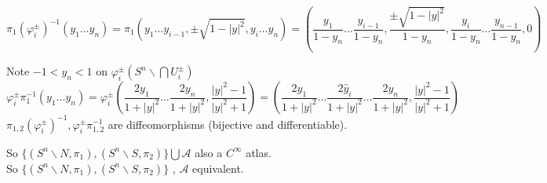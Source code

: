 \begin{enumerate}
\[
\pi_1(\varphi_i^{\pm})^{-1}(y_1 \dots y_n) = \pi_1(y_1 \dots y_{i-1}, \pm \sqrt{ 1 - |y|^2 }, y_i \dots y_n) = \left( \frac{y_1 }{ 1 - y_n} \dots \frac{y_{i-1} }{ 1 - y_n}, \frac{ \pm \sqrt{ 1 - |y|^2 } }{ 1 - y_n } , \frac{y_i}{ 1 - y_n} \dots \frac{y_{n-1}}{ 1 - y_n }, 0 \right)
\]

Note $-1< y_n <1$ on $\varphi_i^{\pm}(S^n\backslash \bigcap U_i^{\pm})$
\[
\varphi_i^{\pm} \pi_1^{-1}(y_1 \dots y_n) = \varphi_i^{\pm}\left( \frac{ 2y_1}{ 1 + |y|^2} \dots \frac{2y_n}{ 1 + |y|^2} , \frac{|y|^2 - 1 }{ |y|^2 + 1 } \right) = \left( \frac{2y_1 }{ 1 + |y|^2} \dots \frac{ 2 \widehat{y}_i }{ 1 + |y|^2 } \dots \frac{ 2y_n }{ 1 + |y|^2 }, \frac{|y|^2 -1}{ |y|^2 + 1 } \right)
\]
$\pi_{1,2}(\varphi_i^{\pm})^{-1}, \varphi_i^{\pm}\pi_{1,2}^{-1}$ are diffeomorphisms (bijective and differentiable).  

So $\lbrace(S^n\backslash N, \pi_1), (S^n\backslash S , \pi_2) \rbrace \bigcup \mathcal{A}$ also a $C^{\infty}$ atlas.  \\
So $\lbrace(S^n\backslash N, \pi_1), (S^n\backslash S , \pi_2) \rbrace$ ,  $\mathcal{A}$ equivalent.  



\end{enumerate}

